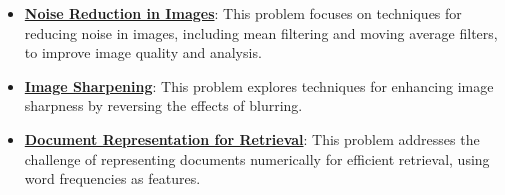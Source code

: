 \documentclass{article}%
\begin{document}
\begin{itemize}[leftmargin=*]
\item \href{https://purdue.brightspace.com/d2l/common/assets/pdfjs-d2l-dist/1.0.14-legacy/web/viewer.html?file=\%2Fcontent\%2Fenforced\%2F1095467-wl.202510.CS.24300.001\%2F07L2-Vision.pdf\%3Fou\%3D1095467\&lang=en-us\&container=d2l-fileviewer-rendered-pdf\&fullscreen=d2l-fileviewer-rendered-pdf-dialog\&height=667#page=35}{\textbf{Noise Reduction in Images}}: This problem focuses on techniques for reducing noise in images, including mean filtering and moving average filters, to improve image quality and analysis.%
\item \href{https://purdue.brightspace.com/d2l/common/assets/pdfjs-d2l-dist/1.0.14-legacy/web/viewer.html?file=\%2Fcontent\%2Fenforced\%2F1095467-wl.202510.CS.24300.001\%2F07L2-Vision.pdf\%3Fou\%3D1095467\&lang=en-us\&container=d2l-fileviewer-rendered-pdf\&fullscreen=d2l-fileviewer-rendered-pdf-dialog\&height=667#page=52}{\textbf{Image Sharpening}}: This problem explores techniques for enhancing image sharpness by reversing the effects of blurring.%
\item \href{https://purdue.brightspace.com/d2l/common/assets/pdfjs-d2l-dist/1.0.14-legacy/web/viewer.html?file=\%2Fcontent\%2Fenforced\%2F1095467-wl.202510.CS.24300.001\%2F07L2-Vision.pdf\%3Fou\%3D1095467\&lang=en-us\&container=d2l-fileviewer-rendered-pdf\&fullscreen=d2l-fileviewer-rendered-pdf-dialog\&height=667#page=20}{\textbf{Document Representation for Retrieval}}: This problem addresses the challenge of representing documents numerically for efficient retrieval, using word frequencies as features.%
\end{itemize}%
\end{document}
